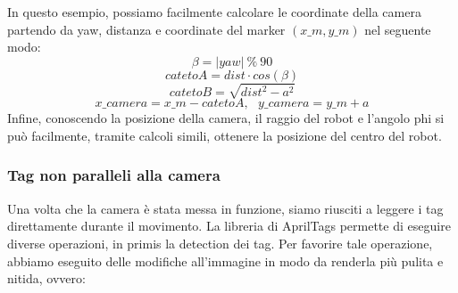 \documentclass[]{article}
\begin{document}
In questo esempio, possiamo facilmente calcolare le coordinate della camera partendo da yaw, distanza e coordinate del marker $(x\_m, y\_m)$ nel seguente modo:
\begin{equation}
    \beta = |yaw|\ \% \ 90
\end{equation}
\begin{equation}
    catetoA = dist\cdot cos(\beta)
\end{equation}
\begin{equation}
    catetoB = \sqrt{dist ^ 2 - a ^ 2}
\end{equation}
\begin{equation}
    x\_camera = x\_m - catetoA,\ \ \ y\_camera = y\_m + a
\end{equation}
Infine, conoscendo la posizione della camera, il raggio del robot e l'angolo phi si può facilmente, tramite calcoli simili, ottenere la posizione del centro del robot.

\subsubsection{Tag non paralleli alla camera}
Una volta che la camera è stata messa in funzione, siamo riusciti a leggere i tag direttamente durante il movimento. La libreria di AprilTags permette di eseguire diverse operazioni, in primis la detection dei tag. Per favorire tale operazione, abbiamo eseguito delle modifiche all'immagine in modo da renderla più pulita e nitida, ovvero:
\end{document}
